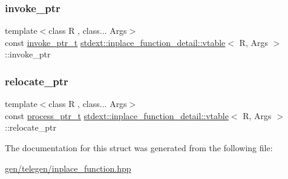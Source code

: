 \subsubsection{\texorpdfstring{invoke\+\_\+ptr}{invoke\_ptr}}
{\footnotesize\ttfamily template$<$class R , class... Args$>$ \\
const \hyperlink{structstdext_1_1inplace__function__detail_1_1vtable_af01857ded8c77028b981d09f77903ffb}{invoke\+\_\+ptr\+\_\+t} \hyperlink{structstdext_1_1inplace__function__detail_1_1vtable}{stdext\+::inplace\+\_\+function\+\_\+detail\+::vtable}$<$ R, Args $>$\+::invoke\+\_\+ptr}

\mbox{\label{structstdext_1_1inplace__function__detail_1_1vtable_ac0af7a0be08b3e087023b1d7c8dd1993}} 
\subsubsection{\texorpdfstring{relocate\+\_\+ptr}{relocate\_ptr}}
{\footnotesize\ttfamily template$<$class R , class... Args$>$ \\
const \hyperlink{structstdext_1_1inplace__function__detail_1_1vtable_af52f23b9203f5508d063e887ce7626a0}{process\+\_\+ptr\+\_\+t} \hyperlink{structstdext_1_1inplace__function__detail_1_1vtable}{stdext\+::inplace\+\_\+function\+\_\+detail\+::vtable}$<$ R, Args $>$\+::relocate\+\_\+ptr}



The documentation for this struct was generated from the following file\+:\begin{DoxyCompactItemize}
\item 
\hyperlink{gen_2telegen_2inplace__function_8hpp}{gen/telegen/inplace\+\_\+function.\+hpp}\end{DoxyCompactItemize}
